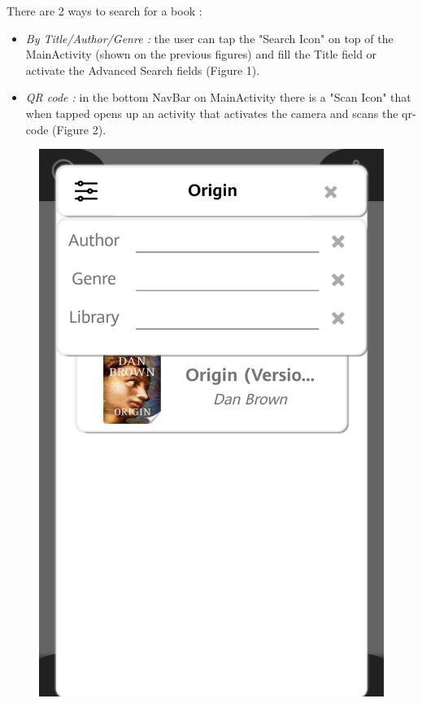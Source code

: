 \newpage
{}
There are 2 ways to search for a book :
\begin{itemize}
	\item \emph{By Title/Author/Genre :} the user can tap the "Search Icon" on top of the MainActivity (shown on the previous figures) and fill the Title field or activate the Advanced Search fields (Figure 1).
	\item \emph{QR code :} in the bottom NavBar on MainActivity there is a "Scan Icon" that when tapped opens up an activity that activates the camera and scans the qr-code (Figure 2).
\end{itemize}
\begin{figure}[H]
	\centering
	\includegraphics[scale=0.15]{Images/UI/Search/1}

\end{figure}
